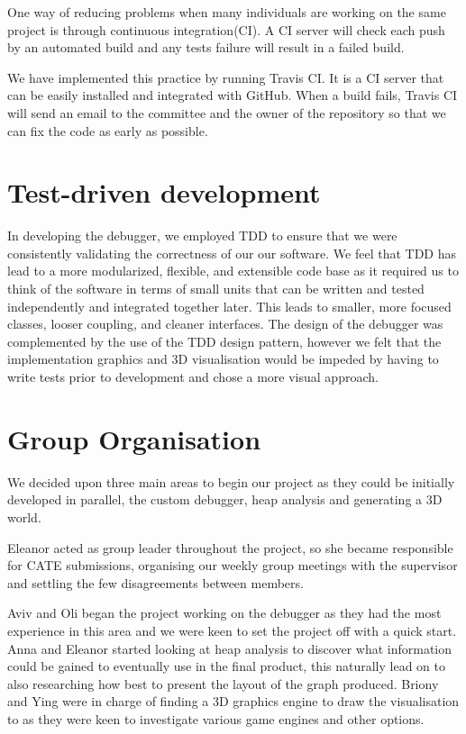 \documentclass[11pt, a4paper]{report}
\begin{document}
One way of reducing problems when many individuals are working on the same project is through continuous integration(CI). A CI server will check each push by an automated build and any tests failure will result in a failed build.

We have implemented this practice by running Travis CI. It is a CI server that can be easily installed and integrated with GitHub. When a build fails, Travis CI will send an email to the committee and the owner of the repository so that we can fix the code as early as possible.

\section{Test-driven development}

In developing the debugger, we employed TDD to ensure that we were consistently validating the correctness of our our software. We feel that TDD has lead to a more modularized, flexible, and extensible code base as it required us to think of the software in terms of small units that can be written and tested independently and integrated together later. This leads to smaller, more focused classes, looser coupling, and cleaner interfaces. The design of the debugger was complemented by the use of the TDD design pattern, however we felt that the implementation graphics and 3D visualisation would be impeded by having to write tests prior to development and chose a more visual approach. 

\section{Group Organisation}

We decided upon three main areas to begin our project as they could be initially developed in parallel, the custom debugger, heap analysis and generating a 3D world.

Eleanor acted as group leader throughout the project, so she became responsible for CATE submissions, organising our weekly group meetings with the supervisor and settling the few disagreements between members.

Aviv and Oli began the project working on the debugger as they had the most experience in this area and we were keen to set the project off with a quick start. Anna and Eleanor started looking at heap analysis to discover what information could be gained to eventually use in the final product, this naturally lead on to also researching how best to present the layout of the graph produced. Briony and Ying were in charge of finding a 3D graphics engine to draw the visualisation to as they were keen to investigate various game engines and other options.
\end{document}
